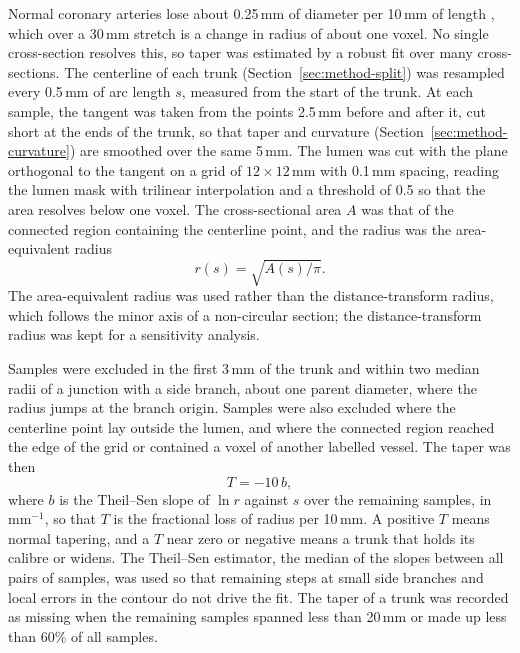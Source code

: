 Normal coronary arteries lose about 0.25\,mm of diameter per 10\,mm of length \cite{medranogracia2016atlas}, which over a 30\,mm stretch is a change in radius of about one voxel.
No single cross-section resolves this, so taper was estimated by a robust fit over many cross-sections.
The centerline of each trunk (Section~\ref{sec:method-split}) was resampled every 0.5\,mm of arc length $s$, measured from the start of the trunk.
At each sample, the tangent was taken from the points 2.5\,mm before and after it, cut short at the ends of the trunk, so that taper and curvature (Section~\ref{sec:method-curvature}) are smoothed over the same 5\,mm.
The lumen was cut with the plane orthogonal to the tangent on a grid of $12 \times 12$\,mm with 0.1\,mm spacing, reading the lumen mask with trilinear interpolation and a threshold of 0.5 so that the area resolves below one voxel.
The cross-sectional area $A$ was that of the connected region containing the centerline point, and the radius was the area-equivalent radius
\begin{equation}
  r(s) = \sqrt{A(s)/\pi}.
  \label{eq:method-taper-radius}
\end{equation}
The area-equivalent radius was used rather than the distance-transform radius, which follows the minor axis of a non-circular section; the distance-transform radius was kept for a sensitivity analysis.

Samples were excluded in the first 3\,mm of the trunk and within two median radii of a junction with a side branch, about one parent diameter, where the radius jumps at the branch origin.
Samples were also excluded where the centerline point lay outside the lumen, and where the connected region reached the edge of the grid or contained a voxel of another labelled vessel.
The taper was then
\begin{equation}
  T = -10\,b,
  \label{eq:method-taper}
\end{equation}
where $b$ is the Theil--Sen slope of $\ln r$ against $s$ over the remaining samples, in mm$^{-1}$, so that $T$ is the fractional loss of radius per 10\,mm.
A positive $T$ means normal tapering, and a $T$ near zero or negative means a trunk that holds its calibre or widens.
The Theil--Sen estimator, the median of the slopes between all pairs of samples, was used so that remaining steps at small side branches and local errors in the contour do not drive the fit.
The taper of a trunk was recorded as missing when the remaining samples spanned less than 20\,mm or made up less than 60\% of all samples.
